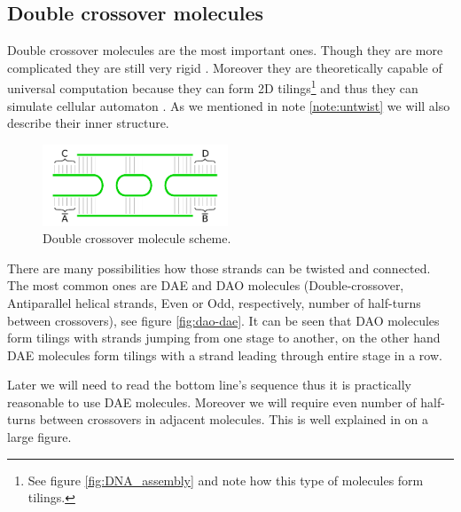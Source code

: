 	\subsection{Double crossover molecules}
	\label{sec:double_crossover}
		
		Double crossover molecules are the most important ones. Though they are more complicated they are still very rigid \cite{seeman93}. Moreover they are theoretically capable of universal computation because they can form 2D tilings\footnote{See figure \ref{fig:DNA_assembly} and note how this type of molecules form tilings.} and thus they can simulate cellular automaton \cite{winfree_phd}. As we mentioned in note \ref{note:untwist} we will also describe their inner structure. %
		
		\begin{figure}[H]
		\begin{center}
			\includegraphics[width=0.492\textwidth]{./figures/strand_types/double_crossover.pdf}
			\caption{Double crossover molecule scheme.}
			\label{fig:double_crossover}
		\end{center}
		\end{figure}
		
		There are many possibilities how those strands can be twisted and connected. The most common ones are DAE and DAO molecules (Double-crossover, Antiparallel helical strands, Even or Odd, respectively, number of half-turns between crossovers), see figure \ref{fig:dao-dae}. It can be seen that DAO molecules form tilings with strands jumping from one stage to another, on the other hand DAE molecules form tilings with a strand leading through entire stage in a row.
		
		Later we will need to read the bottom line's sequence thus it is practically reasonable to use DAE molecules. Moreover we will require even number of half-turns between crossovers in adjacent molecules. This is well explained in \cite[pg. 37]{winfree_phd} on a large figure.
		
